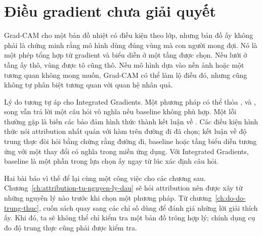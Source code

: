 \section{Điều gradient chưa giải quyết}
\label{sec:ch05-dieu-gradient-chua-giai-quyet}

%
Grad-CAM cho một bản đồ nhiệt có điều kiện theo lớp, nhưng bản đồ ấy không
phải là chứng minh rằng mô hình dùng đúng vùng mà con người mong đợi. Nó là
một phép tổng hợp từ gradient và biểu diễn ở một tầng được chọn. Nếu lưới ở
tầng ấy thô, vùng được tô cũng thô. Nếu mô hình dựa vào nền ảnh hoặc một tương quan không mong
muốn, Grad-CAM có thể làm lộ điều đó, nhưng cũng không tự phân biệt tương quan
với quan hệ nhân quả.

Lý do tương tự áp cho Integrated Gradients. Một phương pháp có thể thỏa ,
 và , song vẫn trả lời một câu hỏi  vô nghĩa
nếu baseline không phù hợp. Một lỗi thường gặp là biến các bảo đảm hình thức
thành kết luận về . Các điều kiện hình thức
nói attribution nhất quán với hàm trên đường đi đã chọn; kết luận về độ trung
thực đòi hỏi bằng chứng rằng đường đi, baseline hoặc tầng biểu diễn tương ứng
với một thay đổi có nghĩa trong miền ứng dụng. Với Integrated Gradients,
baseline là một phần trong lựa chọn ấy ngay từ lúc xác định câu hỏi.

Hai bài báo vì thế để lại cùng một công việc cho các chương sau.
Chương~\ref{ch:attribution-tu-nguyen-ly-dau} sẽ hỏi attribution nên được xây từ những
nguyên lý nào trước khi chọn một phương pháp. Từ chương~\ref{ch:do-do-trung-thuc},
cuốn sách quay sang các chỉ số dùng để đánh giá những lời giải thích ấy. Khi
đó, ta sẽ không thể chỉ kiểm tra một bản đồ trông hợp lý; chính dụng cụ đo độ
trung thực cũng phải được kiểm tra.

%
%
